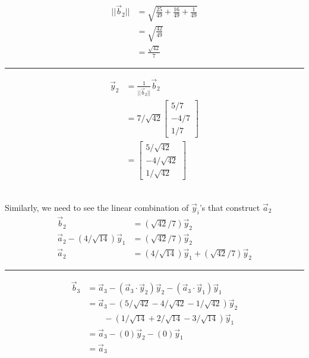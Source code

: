 \documentclass{report}
\begin{document}
\begin{minipage}{0.45\textwidth}
$$
\begin{aligned}
||\vec{b}_2|| &= \sqrt{\frac{25}{49} + \frac{16}{49} + \frac{1}{49}}\\
&=\sqrt{\frac{42}{49}}\\
&=\frac{\sqrt{42}}{7}
\end{aligned}
$$
\hrule
\vspace{0.5em}
$$
\begin{aligned}
\vec{y}_2 &= \frac{1}{||\vec{b}_2||}\vec{b}_2\\
&=7/\sqrt{42} \begin{bmatrix}5/7\\-4/7\\1/7\end{bmatrix}\\
&=\begin{bmatrix}5/\sqrt{42}\\-4/\sqrt{42}\\1/\sqrt{42}\end{bmatrix}
\end{aligned}
$$
\end{minipage}\\
Similarly,  we need to see the linear combination of $\vec{y}_i$'s that construct $\vec{a}_2$
$$
\begin{aligned}
\vec{b}_2 &= (\sqrt{42}/7)\vec{y}_2\\
\vec{a}_2 - (4/\sqrt{14})\vec{y}_1 &= (\sqrt{42}/7)\vec{y}_2\\
\vec{a}_2 & = (4/\sqrt{14})\vec{y}_1 + (\sqrt{42}/7)\vec{y}_2
\end{aligned}
$$
\vspace{0.5em}
\hrule
\vspace{0.5em}
\begin{minipage}{0.45\textwidth}
$$
\begin{aligned}
\vec{b}_3 &= \vec{a}_3 - (\vec{a}_3\cdot\vec{y}_2)\vec{y}_2 - (\vec{a}_3\cdot\vec{y}_1)\vec{y}_1\\
&= \vec{a}_3 - (5/\sqrt{42} - 4/\sqrt{42} - 1/\sqrt{42})\vec{y}_2 \\ 
&\qquad- (1/\sqrt{14} + 2/\sqrt{14} - 3/\sqrt{14})\vec{y}_1\\
&= \vec{a}_3 - (0)\vec{y}_2 - (0)\vec{y}_1\\
&=\vec{a}_3
\end{aligned}
$$
\end{minipage}
\end{document}
